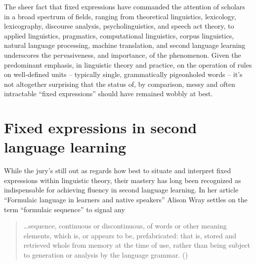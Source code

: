 \documentclass[english,output=paper,colorlinks,citecolor=brown]{../langscibook}
\begin{document}
The sheer fact that fixed expressions have commanded the attention of scholars in a broad spectrum of fields, ranging from theoretical linguistics, lexicology, lexicography, discourse analysis, psycholinguistics, and speech act theory, to applied linguistics, pragmatics, computational linguistics, corpus linguistics, natural language processing, machine translation, and second language learning underscores the pervasiveness, and importance, of the phenomenon. Given the predominant emphasis, in linguistic theory and practice, on the operation of rules on well-defined units – typically single, grammatically pigeonholed words – it’s not altogether surprising that the status of, by comparison, messy and often intractable ``fixed expressions'' should have remained wobbly at best. 

\section{Fixed expressions in second language learning}

While the jury’s still out as regards how best to situate and interpret fixed expressions within linguistic theory, their mastery has long been recognized as indispensable for achieving fluency in second language learning. In her article “Formulaic language in learners and native speakers” Alison Wray settles on the term ``formulaic sequence'' to signal any 

\begin{quote}
    …sequence, continuous or discontinuous, of words or other meaning elements, which is, or appears to be, prefabricated: that is, stored and retrieved whole from memory at the time of use, rather than being subject to generation or analysis by the language grammar. (\citeyear[214]{Wray1999})  
\end{quote}
\end{document}
